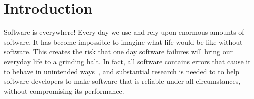\section{Introduction}\label{sec:intro}

Software is everywhere! Every day we use and rely upon enormous amounts of software, %
It has become impossible to imagine what life would be like without software. 
This creates the risk that one day software failures will bring our everyday life to a grinding halt. In fact, all software
contains errors that cause it to behave in unintended ways~\cite{GanapathiP05,MatiasPBH14},
and substantial research is needed to 
to help software developers to make software that is reliable under all circumstances, without compromising its performance.




